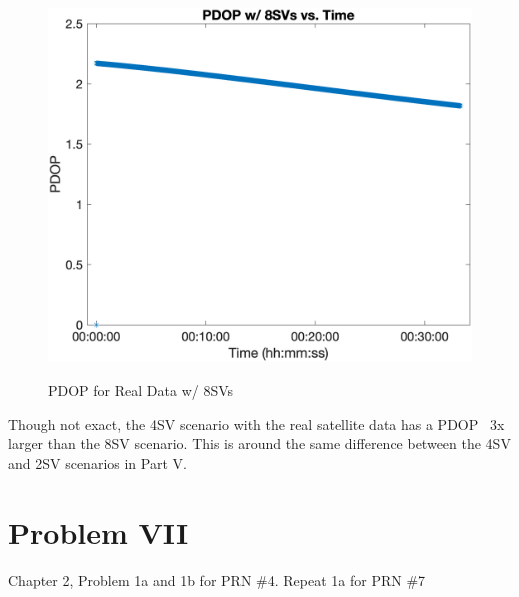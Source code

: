 \documentclass{article}
\begin{document}
\begin{figure}[H]
    \centering
    \includegraphics[width=0.75\linewidth]{../figures/p6_8svs_pdop.png}\label{fig:p6_8svs_pdop}
    \caption{PDOP for Real Data w/ 8SVs}
\end{figure}

Though not exact, the 4SV scenario with the real satellite data has a PDOP ~3x larger than the 8SV scenario.  This is around the same difference between the 4SV and 2SV scenarios in Part V.

\section*{Problem VII}
Chapter 2, Problem 1a and 1b for PRN \#4. Repeat 1a for PRN \#7
\end{document}
